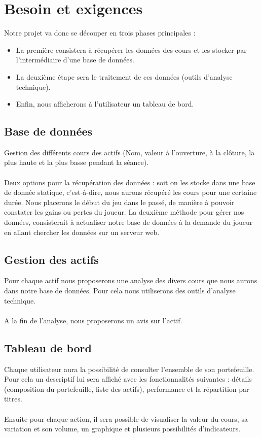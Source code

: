 \chapter{Besoin et exigences}
Notre projet va donc se découper en trois phases principales : 
\begin{itemize}
\item La première consistera à récupérer les données des cours et les stocker par l’intermédiaire d’une base de données.
\item La deuxième étape sera le traitement de ces données (outils d’analyse technique).
\item Enfin, nous afficherons à l’utilisateur un tableau de bord. 
\end{itemize}

\section{Base de données}
Gestion des différents cours des actifs (Nom, valeur à l’ouverture, à la clôture, la plus haute et la plus basse pendant la séance). \\ \\ 
Deux options pour la récupération des données : soit on les stocke dans une base de donnée statique, c’est-à-dire, nous aurons récupéré les cours pour une certaine durée. Nous placerons le début du jeu dans le passé, de manière à pouvoir constater les gains ou pertes du joueur. La deuxième méthode pour gérer nos données, consisterait à actualiser notre base de données à la demande du joueur en allant chercher les données sur un serveur web. 

\section{Gestion des actifs}
Pour chaque actif nous proposerons une analyse des divers cours que nous aurons dans notre base de données. Pour cela nous utiliserons des outils d’analyse technique. \\ \\
A la fin de l’analyse, nous proposerons un avis sur l’actif. 

\section{Tableau de bord}
Chaque utilisateur aura la possibilité de consulter l’ensemble de son portefeuille. Pour cela un descriptif lui sera affiché avec les fonctionnalités suivantes : détails (composition du portefeuille, liste des actifs), performance et la répartition par titres. \\ \\
Ensuite pour chaque action, il sera possible de visualiser la valeur du cours, sa variation et son volume, un graphique et plusieurs possibilités d’indicateurs. 